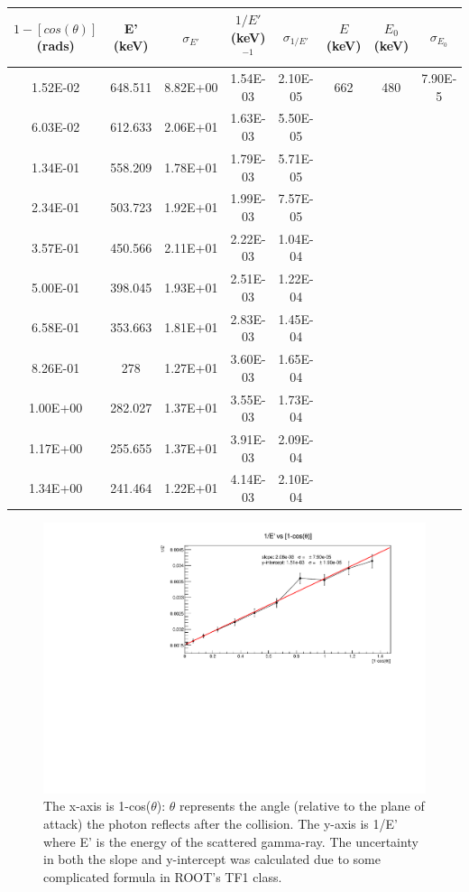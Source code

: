 \documentclass[a4paper,12pt,english]{all-in-one} %
\begin{document}
\begin{table}[!]
\centering
\begin{tabular}{c|c|c|c|c|c|c|c} 
$1-[cos(\theta)]$ (rads) & E' (keV) & $\sigma_{E'}$ & $1/E'$ (keV)$^{-1}$ & $\sigma_{1/E'}$ & $E$ (keV)  & $E_0$ (keV) & $\sigma_{E_0}$ \\ \hline

1.52E-02 & 648.511 & 8.82E+00 & 1.54E-03 & 2.10E-05 & 662 & 480 & 7.90E-5 \\
6.03E-02 & 612.633 & 2.06E+01 & 1.63E-03 & 5.50E-05 &  &  &  \\
1.34E-01 & 558.209 & 1.78E+01 & 1.79E-03 & 5.71E-05 &  &  & \\
2.34E-01 & 503.723 & 1.92E+01 & 1.99E-03 & 7.57E-05 &  &  &  \\
3.57E-01 & 450.566 & 2.11E+01 & 2.22E-03 & 1.04E-04 &  &  &  \\
5.00E-01 & 398.045 & 1.93E+01 & 2.51E-03 & 1.22E-04 &  &  &  \\
6.58E-01 & 353.663 & 1.81E+01 & 2.83E-03 & 1.45E-04 &  &  &  \\
8.26E-01 & 278 & 1.27E+01 & 3.60E-03 & 1.65E-04 &  &  &  \\
1.00E+00 & 282.027 & 1.37E+01 & 3.55E-03 & 1.73E-04 &  &  &  \\
1.17E+00 & 255.655 & 1.37E+01& 3.91E-03 & 2.09E-04 &  &  &  \\
1.34E+00 & 241.464 & 1.22E+01 & 4.14E-03 & 2.10E-04 &  &  &  \\
\end{tabular}
\caption{}
\label{tab:data_compton}
\end{table}

\begin{figure}[tbh]
    \centering
    \includegraphics[width=1.0\linewidth]{6-compton/images/COMPTON-DATA.pdf}
    \caption{ The x-axis is 1-cos($\theta$):  $\theta$ represents the angle (relative to the plane of attack) the photon reflects after the collision. The y-axis is 1/E' where E' is the energy of the scattered gamma-ray. The uncertainty in both the slope and y-intercept was calculated due to some complicated formula in ROOT's TF1 class.
    }
    \label{fig:compton-plot}
\end{figure}
\end{document}
